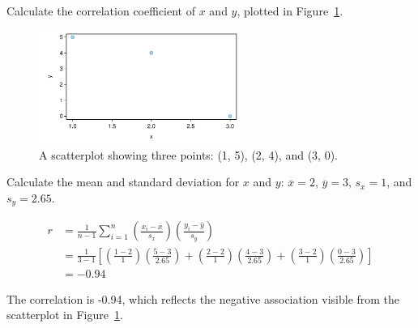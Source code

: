 \begin{example}{Calculate the correlation coefficient of $x$ and $y$, plotted in Figure~\ref{fig:corCalcSimple}.
		
		\begin{figure}[h]
			\centering
			\includegraphics[width=0.6\textwidth]
			{ch_intro_to_data_oi_biostat/figures/corCalcSimple/corCalcSimple.pdf}
			\caption{A scatterplot showing three points: (1, 5), (2, 4), and (3, 0).} 
			\label{fig:corCalcSimple}
		\end{figure}
		
} Calculate the mean and standard deviation for $x$ and $y$: $\overline{x} = 2$, $\overline{y} = 3$, $s_x = 1$, and $s_y = 2.65$. 

\begin{align*}
r &=  \frac{1}{n-1}\sum^{n}_{i=1}
\left(\frac{x_{i}-\overline{x}}
{s_{x}}\right)\left(\frac{y_{i}-\overline{y}}{s_{y}}\right) \\
&= \frac{1}{3 - 1} \left[\left(\frac{1 - 2}
{1}\right)\left(\frac{5 - 3}{2.65}\right) + \left(\frac{2 - 2}
{1}\right)\left(\frac{4 - 3}{2.65}\right) + \left(\frac{3 - 2}
{1}\right)\left(\frac{0 - 3}{2.65}\right)  \right] \\
&= -0.94
\end{align*}

The correlation is -0.94, which reflects the negative association visible from the scatterplot in Figure~\ref{fig:corCalcSimple}.
	

	
\end{example}

